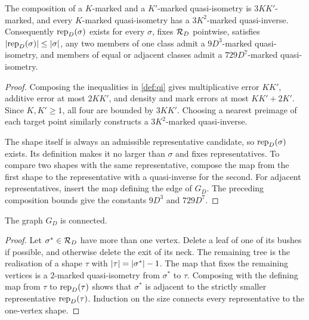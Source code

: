 \begin{lemma}
\label{thm:shape-net}
\leanok
{}
The composition of a $K$-marked and a $K'$-marked quasi-isometry is $3KK'$-marked, and every
$K$-marked quasi-isometry has a $3K^2$-marked quasi-inverse. Consequently $\operatorname{rep}_D(\sigma)$
exists for every $\sigma$, fixes $\mathcal{R}_D$ pointwise, satisfies
$\lvert \operatorname{rep}_D(\sigma) \rvert\leq\lvert \sigma \rvert$, any two members of one class admit a $9D^3$-marked
quasi-isometry, and members of equal or adjacent classes admit a $729D^7$-marked
quasi-isometry.
\end{lemma}

\begin{proof}
\leanok
{}
Composing the inequalities in \cref{def:qi} gives multiplicative error $KK'$, additive error
at most $2KK'$, and density and mark errors at most $KK'+2K'$. Since $K,K'\geq1$, all four
are bounded by $3KK'$. Choosing a nearest preimage of each target point similarly constructs a
$3K^2$-marked quasi-inverse.

The shape itself is always an admissible representative candidate, so $\operatorname{rep}_D(\sigma)$ exists.
Its definition makes it no larger than $\sigma$ and fixes representatives. To compare two shapes
with the same representative, compose the map from the first shape to the representative with a
quasi-inverse for the second. For adjacent representatives, insert the map defining the edge of
$G_D$. The preceding composition bounds give the constants $9D^3$ and $729D^7$.
\end{proof}

\begin{lemma}
\label{thm:shape-connected}
\leanok
{}
The graph $G_D$ is connected.
\end{lemma}

\begin{proof}
\leanok
Let $\sigma^*\in\mathcal{R}_D$ have more than one vertex. Delete a leaf of one of its bushes if possible,
and otherwise delete the exit of its neck. The remaining tree is the realisation of a shape
$\tau$ with $\lvert \tau \rvert=\lvert \sigma^* \rvert-1$. The map that fixes the remaining vertices is a
$2$-marked quasi-isometry from $\sigma^*$ to $\tau$. Composing with the defining map from
$\tau$ to $\operatorname{rep}_D(\tau)$ shows that $\sigma^*$ is adjacent to the strictly smaller
representative $\operatorname{rep}_D(\tau)$. Induction on the size connects every representative to the
one-vertex shape.
\end{proof}

